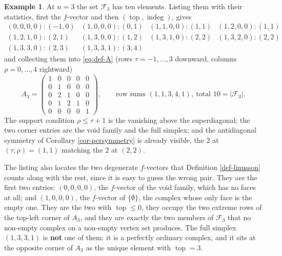 \documentclass[11pt, a4paper, abstract=yes]{scrartcl}
\theoremstyle{definition}
\newtheorem{mexample}[definition]{Example}
\theoremstyle{remark}
\theoremstyle{plain}
\newcommand{\indeg}{\operatorname{indeg}}
\newcommand{\tp}{\operatorname{top}}
\begin{document}
\begin{mexample}
At \(n=3\) the set \(\mathcal F_3\) has ten elements. Listing them with their statistics, first the
\(f\)-vector and then \((\tp,\indeg)\), gives
\[
\begin{array}{llll}
 (0,0,0,0)\colon(-1,0) & (1,0,0,0)\colon(0,1) & (1,1,0,0)\colon(1,1) & (1,2,0,0)\colon(1,1)\\
 (1,2,1,0)\colon(2,1)  & (1,3,0,0)\colon(1,2) & (1,3,1,0)\colon(2,2) & (1,3,2,0)\colon(2,2)\\
 (1,3,3,0)\colon(2,3)  & (1,3,3,1)\colon(3,4) & &
\end{array}
\]
and collecting them into \eqref{eq:def-A} (rows \(\tau=-1,\dots,3\) downward, columns
\(\rho=0,\dots,4\) rightward)
\[
  A_3=\begin{pmatrix}
    1&0&0&0&0\\ 0&1&0&0&0\\ 0&2&1&0&0\\ 0&1&2&1&0\\ 0&0&0&0&1
  \end{pmatrix},
  \qquad \text{row sums } (1,1,3,4,1),\ \text{total }10=\lvert\mathcal F_3\rvert .
\]
The support condition \(\rho\le\tau+1\) is the vanishing above the superdiagonal; the two corner
entries are the void family and the full simplex; and the antidiagonal symmetry of
Corollary \ref{cor-persymmetry} is already visible, the \(2\) at \((\tau,\rho)=(1,1)\) matching the
\(2\) at \((2,2)\).

The listing also locates the two degenerate \(f\)-vectors that Definition \ref{def-linusson} counts
along with the rest, since it is easy to guess the wrong pair. They are the first two entries:
\((0,0,0,0)\), the \(f\)-vector of the void family, which has no faces at all; and \((1,0,0,0)\), the
\(f\)-vector of \(\lbrace\emptyset\rbrace\), the complex whose only face is the empty one. They are
the two with \(\tp\le0\), they occupy the two extreme rows of the top-left corner of \(A_3\), and they
are exactly the two members of \(\mathcal F_3\) that no non-empty complex on a non-empty vertex set
produces. The full simplex \((1,3,3,1)\) is \textbf{not} one of them: it is a perfectly ordinary complex, and
it sits at the opposite corner of \(A_3\) as the unique element with \(\tp=3\).
\label{ex-A}
\end{mexample}
\end{document}
